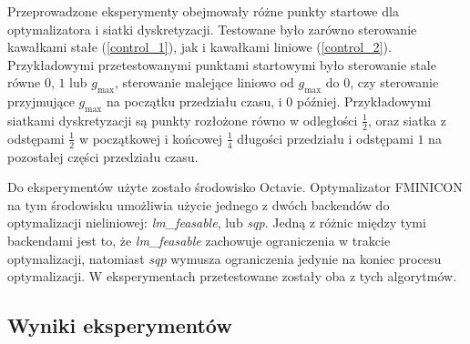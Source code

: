 \documentclass[11pt]{article}
\begin{document}
Przeprowadzone eksperymenty obejmowały różne punkty startowe dla optymalizatora i siatki dyskretyzacji. Testowane było zarówno sterowanie kawałkami stałe (\ref{control_1}), jak i kawałkami liniowe (\ref{control_2}). Przykładowymi przetestowanymi punktami startowymi było sterowanie stale równe $0$, $1$ lub $g_{\max}$, sterowanie malejące liniowo od $g_{\max}$ do $0$, czy sterowanie przyjmujące $g_{\max}$ na początku przedziału czasu, i $0$ później. Przykładowymi siatkami dyskretyzacji są punkty rozłożone równo w odległości $\frac{1}{2}$, oraz siatka z odstępami $\frac{1}{2}$ w początkowej i końcowej $\frac{1}{4}$ długości przedziału i odstępami $1$ na pozostałej części przedziału czasu.

Do eksperymentów użyte zostało środowisko Octavie. Optymalizator FMINICON na tym środowisku umożliwia użycie jednego z dwóch backendów do optymalizacji nieliniowej: {\it lm\_feasable}, lub {\it sqp}. Jedną z różnic między tymi backendami jest to, że {\it lm\_feasable\/} zachowuje ograniczenia w trakcie optymalizacji, natomiast {\it sqp\/} wymusza ograniczenia jedynie na koniec procesu optymalizacji. W eksperymentach przetestowane zostały oba z tych algorytmów.

\subsection{Wyniki eksperymentów}
\end{document}
